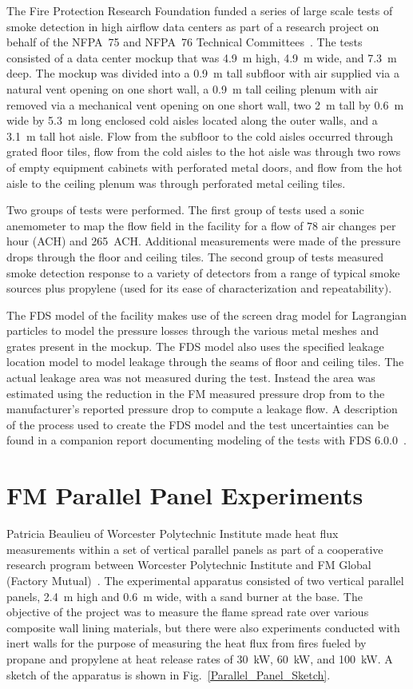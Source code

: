 The Fire Protection Research Foundation funded a series of large scale tests of smoke detection in high airflow data centers as part of a research project on behalf of the NFPA~75 and NFPA~76 Technical Committees~\cite{FM_Datacenter_Rpt}. The tests consisted of a data center mockup that was 4.9~m high, 4.9~m wide, and 7.3~m deep. The mockup was divided into a 0.9~m tall subfloor with air supplied via a natural vent opening on one short wall, a 0.9~m tall ceiling plenum with air removed via a mechanical vent opening on one short wall, two 2~m tall by 0.6~m wide by 5.3~m long enclosed cold aisles located along the outer walls, and a 3.1~m tall hot aisle.  Flow from the subfloor to the cold aisles occurred through grated floor tiles, flow from the cold aisles to the hot aisle was through two rows of empty equipment cabinets with perforated metal doors, and flow from the hot aisle to the ceiling plenum was through perforated metal ceiling tiles.

Two groups of tests were performed. The first group of tests used a sonic anemometer to map the flow field in the facility for a flow of 78 air changes per hour (ACH) and 265~ACH. Additional measurements were made of the pressure drops through the floor and ceiling tiles. The second group of tests measured smoke detection response to a variety of detectors from a range of typical smoke sources plus propylene (used for its ease of characterization and repeatability).

The FDS model of the facility makes use of the screen drag model for Lagrangian particles to model the pressure losses through the various metal meshes and grates present in the mockup. The FDS model also uses the specified leakage location model to model leakage through the seams of floor and ceiling tiles. The actual leakage area was not measured during the test. Instead the area was estimated using the reduction in the FM measured pressure drop from to the manufacturer's reported pressure drop to compute a leakage flow. A description of the process used to create the FDS model and the test uncertainties can be found in a companion report documenting modeling of the tests with FDS 6.0.0~\cite{FDS_Datacenter_Rpt}.


\section{FM Parallel Panel Experiments}
\label{FM_Parallel_Panel_Description}

Patricia Beaulieu of Worcester Polytechnic Institute made heat flux measurements within a set of vertical parallel panels as part of a cooperative research program between Worcester Polytechnic Institute and FM Global (Factory Mutual)~\cite{Beaulieu:FM}. The experimental apparatus consisted of two vertical parallel panels, 2.4~m high and 0.6~m wide, with a sand burner at the base. The objective of the project was to measure the flame spread rate over various composite wall lining materials, but there were also experiments conducted with inert walls for the purpose of measuring the heat flux from fires fueled by propane and propylene at heat release rates of 30~kW, 60~kW, and 100~kW. A sketch of the apparatus is shown in Fig.~\ref{Parallel_Panel_Sketch}.

